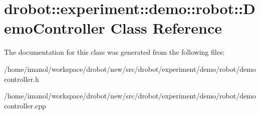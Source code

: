 \hypertarget{classdrobot_1_1experiment_1_1demo_1_1robot_1_1DemoController}{\section{drobot\-:\-:experiment\-:\-:demo\-:\-:robot\-:\-:Demo\-Controller Class Reference}
\label{classdrobot_1_1experiment_1_1demo_1_1robot_1_1DemoController}
}


The documentation for this class was generated from the following files\-:\begin{DoxyCompactItemize}
\item 
/home/imanol/workspace/drobot/new/src/drobot/experiment/demo/robot/democontroller.\-h\item 
/home/imanol/workspace/drobot/new/src/drobot/experiment/demo/robot/democontroller.\-cpp\end{DoxyCompactItemize}

